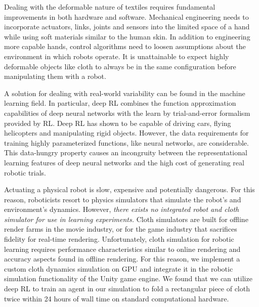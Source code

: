 \documentclass[\home/main.tex]{subfiles}
\begin{document}
Dealing with the deformable nature of textiles requires fundamental improvements in both hardware and software. Mechanical engineering needs to incorporate actuators, links, joints and sensors into the limited space of a hand while using soft materials similar to the human skin. In addition to engineering more capable hands, control algorithms need to loosen assumptions about the environment in which robots operate. It is unattainable to expect highly deformable objects like cloth to always be in the same configuration before manipulating them with a robot.

A solution for dealing with real-world variability can be found in the machine learning field. In particular, deep \gls{RL} combines the function approximation capabilities of deep neural networks with the learn by trial-and-error formalism provided by \gls{RL}. Deep \gls{RL} has shown to be capable of driving cars, flying helicopters and manipulating rigid objects. However, the data requirements for training highly parameterized functions, like neural networks, are considerable. This data-hungry property causes an incongruity between the representational learning features of deep neural networks and the high cost of generating real robotic trials.



Actuating a physical robot is slow, expensive and potentially dangerous. For this reason, roboticists resort to physics simulators that simulate the robot's and environment's dynamics. However, \emph{there exists no integrated robot and cloth simulator for use in learning experiments.}
Cloth simulators are built for offline render farms in the movie industry, or for the game industry that sacrifices fidelity for real-time rendering. Unfortunately, cloth simulation for robotic learning requires performance characteristics similar to online rendering and accuracy aspects found in offline rendering. For this reason, we implement a custom cloth dynamics simulation on GPU and integrate it in the robotic simulation functionality of the Unity game engine.
We found that we can utilize deep \gls{RL} to train an agent in our simulation to fold a rectangular piece of cloth twice within \qty{24}{} hours of wall time on standard computational hardware. 
\end{document}
